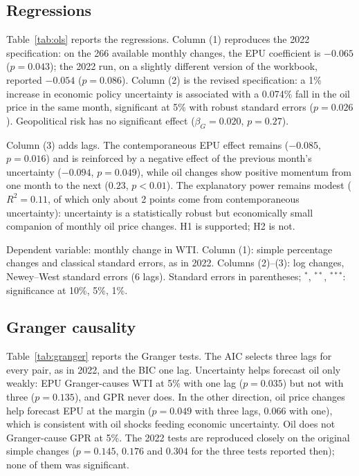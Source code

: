 \documentclass[11pt,a4paper]{article}
\begin{document}
\subsection{Regressions}

Table~\ref{tab:ols} reports the regressions. Column (1) reproduces the 2022
specification: on the 266 available monthly changes, the EPU coefficient is
$-0.065$ ($p=0.043$); the 2022 run, on a slightly different version of the
workbook, reported $-0.054$ ($p=0.086$). Column (2) is the revised specification:
a 1\% increase in economic policy uncertainty is associated with a 0.074\%
fall in the oil price in the same month, significant at 5\% with robust standard
errors ($p=0.026$). Geopolitical risk has no significant effect
($\beta_G=0.020$, $p=0.27$).

Column (3) adds lags. The contemporaneous EPU effect remains ($-0.085$,
$p=0.016$) and is reinforced by a negative effect of the previous month's
uncertainty ($-0.094$, $p=0.049$), while oil changes show positive momentum from
one month to the next ($0.23$, $p<0.01$). The explanatory power remains modest
($R^2=0.11$, of which only about 2 points come from contemporaneous
uncertainty): uncertainty is a statistically robust but economically small
companion of monthly oil price changes. H1 is supported; H2 is not.

\begin{table}[H]
\centering
\caption{Oil price changes and uncertainty}
\label{tab:ols}
\begin{small}

\end{small}
\par\smallskip\parbox{0.92\textwidth}{\footnotesize Dependent variable: monthly
change in WTI. Column (1): simple percentage changes and classical standard
errors, as in 2022. Columns (2)--(3): log changes, Newey--West standard errors
(6 lags). Standard errors in parentheses; $^{*}$, $^{**}$, $^{***}$: significance
at 10\%, 5\%, 1\%.}
\end{table}

\subsection{Granger causality}

Table~\ref{tab:granger} reports the Granger tests. The AIC selects three lags
for every pair, as in 2022, and the BIC one lag. Uncertainty helps forecast oil
only weakly: EPU Granger-causes WTI at 5\% with one lag ($p=0.035$) but not with
three ($p=0.135$), and GPR never does. In the other direction, oil price changes
help forecast EPU at the margin ($p=0.049$ with three lags, $0.066$ with one),
which is consistent with oil shocks feeding economic uncertainty. Oil does not
Granger-cause GPR at 5\%. The 2022 tests are reproduced closely on the original
simple changes ($p=0.145$, $0.176$ and $0.304$ for the three tests reported
then); none of them was significant.
\end{document}
